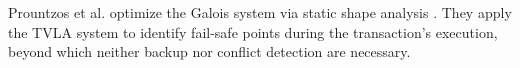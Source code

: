 Prountzos et al. \cite{PrountzosMPM11} optimize the Galois system \cite{Galois} via static shape analysis \cite{MoolyToplas}. They apply the TVLA system to identify fail-safe points during the transaction's execution, beyond which neither backup nor conflict detection are necessary. 





